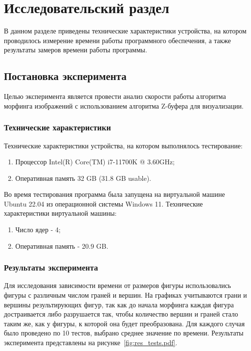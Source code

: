 \chapter{Исследовательский раздел}

В данном разделе приведены технические характеристики устройства, на котором проводилось измерение времени работы программного обеспечения, а также результаты замеров времени работы программы.


\section{Постановка эксперимента}

Целью эксперимента является провести анализ скорости работы алгоритма морфинга изображений с использованием алгоритма Z-буфера для визуализации.

\subsection{Технические характеристики}

Технические характеристики устройства, на котором выполнялось тестирование:
\begin{enumerate}
	\item Процессор Intel(R) Core(TM) i7-11700K @ 3.60GHz;
	\item Оперативная память 32 GB (31.8 GB usable).
\end{enumerate}

Во время тестирования программа была запущена на виртуальной машине Ubuntu 22.04 из операционной системы Windows 11. 
Технические характеристики виртуальной машины:
\begin{enumerate}
	\item Число ядер - 4;
	\item Оперативная память - 20.9 GB.
\end{enumerate}

\subsection{Результаты эксперимента}

Для исследования зависимости времени от размеров фигуры использовались фигуры с различным числом граней и вершин. 
На графиках учитываются грани и вершины результирующих фигур, так как до начала морфинга каждая фигура достраивается либо разрушается так, чтобы количество вершин и граней стало таким же, как у фигуры, к которой она будет преобразована. 
Для каждого случая было проведено по 10 тестов, выбрано среднее значение по времени. 
Результаты эксперимента представлены на рисунке~\ref{fig:res_tests.pdf}.

